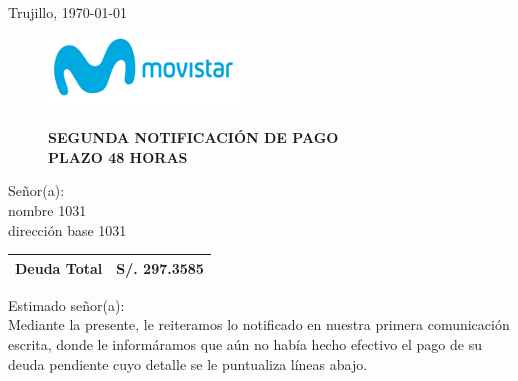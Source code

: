 %
%

\begin{flushright}
    Trujillo, \today
\end{flushright}
\vspace{-0.5cm}

\begin{figure}[h]
\begin{minipage}[b]{5.106458333cm}
\includegraphics[natwidth=5.106458333cm, natheight=1.931458333cm]{resources/business_logo.png}
\end{minipage}
\begin{minipage}[b][1.9314cm][t]{11cm}
\begin{flushright}
{\LARGE \bf SEGUNDA NOTIFICACIÓN DE PAGO\\PLAZO 48 HORAS}
\end{flushright}
\end{minipage}
\end{figure}

\noindent
Señor(a):\\
nombre 1031\\
dirección base 1031

\begin{flushright}
\bf \large
\begin{tabular}{|p{3.2cm} p{3.2cm}|}
\hline
Deuda Total & S/. 297.3585 \\
\hline
\end{tabular}
\end{flushright}

\noindent
Estimado señor(a):\\
Mediante la presente, le reiteramos lo notificado en nuestra primera comunicación escrita, donde le informáramos que aún no había hecho efectivo el pago de su deuda pendiente cuyo detalle se le puntualiza líneas abajo.

